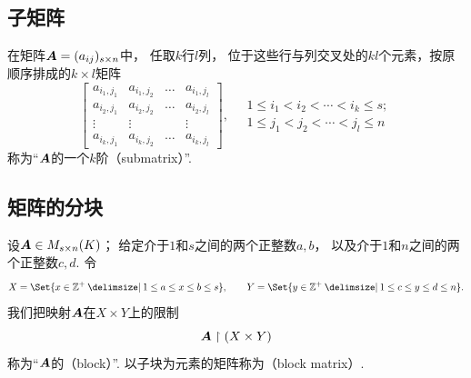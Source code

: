 \subsection{子矩阵}
\begin{definition}
在矩阵\(\boldsymbol{A}=(a_{ij})_{s \times n}\)中，
任取\(k\)行\(l\)列，
位于这些行与列交叉处的\(kl\)个元素，按原顺序排成的\(k \times l\)矩阵\begin{equation*}
	\begin{bmatrix}
		a_{i_1,j_1} & a_{i_1,j_2} & \dots & a_{i_1,j_l} \\
		a_{i_2,j_1} & a_{i_2,j_2} & \dots & a_{i_2,j_l} \\
		\vdots & \vdots & & \vdots \\
		a_{i_k,j_1} & a_{i_k,j_2} & \dots & a_{i_k,j_l}
	\end{bmatrix},
	\quad
	\begin{array}{c}
		1 \leq i_1 < i_2 < \dotsb < i_k \leq s; \\
		1 \leq j_1 < j_2 < \dotsb < j_l \leq n
	\end{array}
\end{equation*}称为“\(\boldsymbol{A}\)的一个\(k\)阶（submatrix）”.
\end{definition}

\subsection{矩阵的分块}
\begin{definition}
设\(\boldsymbol{A} \in M_{s \times n}(K)\)；
给定介于\(1\)和\(s\)之间的两个正整数\(a,b\)，
以及介于\(1\)和\(n\)之间的两个正整数\(c,d\).
令\begin{equation*}
	X=\Set{ x\in\mathbb{Z}^+ \given 1 \leq a \leq x \leq b \leq s },
	\qquad
	Y=\Set{ y\in\mathbb{Z}^+ \given 1 \leq c \leq y \leq d \leq n }.
\end{equation*}
我们把映射\(\boldsymbol{A}\)在\(X \times Y\)上的限制\begin{equation*}
	\boldsymbol{A}\upharpoonright(X \times Y)
\end{equation*}
称为“\(\boldsymbol{A}\)的（block）”.
以子块为元素的矩阵称为（block matrix）.
\end{definition}

